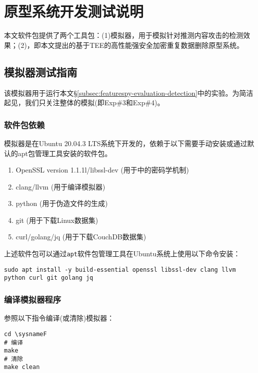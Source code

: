 \chapter{原型系统开发测试说明}

本文软件包提供了两个工具包：(1)\sysnameF 模拟器，用于模拟针对推测内容攻击的检测效果；(2)\prototype ，即本文提出的基于TEE的高性能强安全加密重复数据删除原型系统。

\section{\sysnameF 模拟器测试指南}
该模拟器用于运行本文\S\ref{subsec:featurespy-evaluation-detection}中的实验。为简洁起见，我们只关注整体\sysnameF 的模拟(即Exp\#3和Exp\#4)。

\subsection*{软件包依赖}

\sysnameF 模拟器是在Ubuntu 20.04.3 LTS系统下开发的，依赖于以下需要手动安装或通过默认的apt包管理工具安装的软件包。

\begin{enumerate}
    \item OpenSSL version 1.1.1l/libssl-dev (用于\sysnameF 中的密码学机制)
    \item clang/llvm (用于编译模拟器)
    \item python (用于伪造文件的生成)
    \item git (用于下载Linux数据集)
    \item curl/golang/jq (用于下载CouchDB数据集)
\end{enumerate}

上述软件包可以通过{\tt apt}软件包管理工具在Ubuntu系统上使用以下命令安装：

\begin{lstlisting}[style=shell]
sudo apt install -y build-essential openssl libssl-dev clang llvm python curl git golang jq
\end{lstlisting}

\subsection*{编译模拟器程序}

参照以下指令编译(或清除)\sysnameF 模拟器：

\begin{lstlisting}[style=shell]
cd \sysnameF
# 编译
make
# 清除
make clean
\end{lstlisting}

